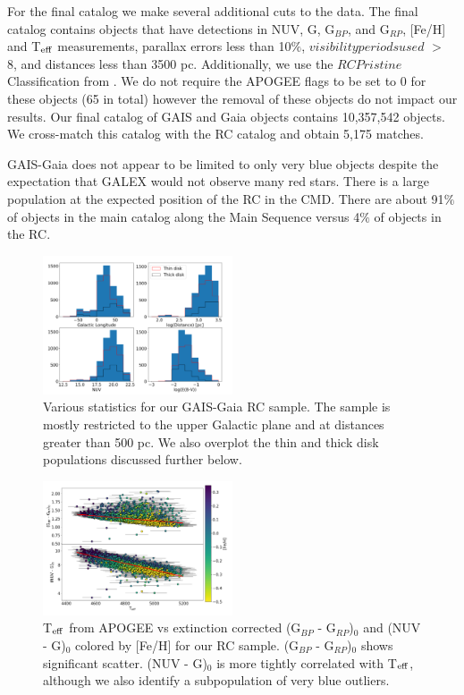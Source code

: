 \documentclass[twocolumn]{emulateapj}
\begin{document}
For the final catalog we make several additional cuts to the data. The final catalog contains objects that have detections in NUV, G, G$_{BP}$, and G$_{RP}$, [Fe/H] and T$_{\rm{eff}}$ measurements, parallax errors less than 10$\%$, $visibility$\textunderscore$periods$\textunderscore$used$ $>$ 8, and distances less than 3500 pc. Additionally, we use the $RC$\textunderscore$Pristine$ Classification from \citealt{ting18}. We do not require the APOGEE flags to be set to 0 for these objects (65 in total) however the removal of these objects do not impact our results. Our final catalog of GAIS and Gaia objects contains 10,357,542 objects. We cross-match this catalog with the RC catalog and obtain 5,175 matches. 

GAIS-Gaia does not appear to be limited to only very blue objects despite the expectation that GALEX would not observe many red stars. There is a large population at the expected position of the RC in the CMD. There are about 91$\%$ of objects in the main catalog along the Main Sequence versus 4$\%$ of objects in the RC. 

\begin{figure}[]
\centering
\includegraphics[width=0.5\textwidth]{f3.pdf}
\caption{Various statistics for our GAIS-Gaia RC sample. The sample is mostly restricted to the upper Galactic plane and at distances greater than 500 pc. We also overplot the thin and thick disk populations discussed further below.}
\end{figure}

\begin{figure}[]
\centering
\includegraphics[width=0.5\textwidth]{f4.pdf}
\caption{T$_{\rm{eff}}$ from APOGEE vs extinction corrected (G$_{BP}$ - G$_{RP}$)$_0$ and (NUV - G)$_0$ colored by [Fe/H] for our RC sample. (G$_{BP}$ - G$_{RP}$)$_0$ shows significant scatter.  (NUV - G)$_0$ is more tightly correlated with T$_{\rm{eff}}$, although we also identify a subpopulation of very blue outliers.}
\end{figure}
\end{document}
